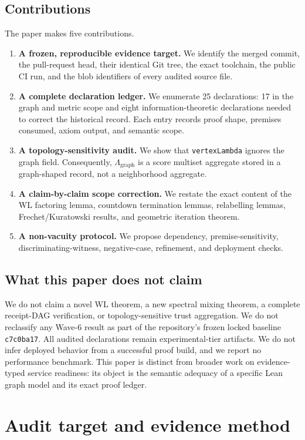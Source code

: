 \documentclass[10pt,letterpaper]{article}
\theoremstyle{definition}
\newcommand{\Lgraph}{\Lambda_{\mathrm{graph}}}
\newcommand{\baseline}{\texttt{c7c0ba17}}
\begin{document}
\subsection{Contributions}
The paper makes five contributions.
\begin{enumerate}
\item \textbf{A frozen, reproducible evidence target.} We identify the merged
  commit, the pull-request head, their identical Git tree, the exact toolchain,
  the public CI run, and the blob identifiers of every audited source file.
\item \textbf{A complete declaration ledger.} We enumerate 25 declarations:
  17 in the graph and metric scope and eight information-theoretic declarations
  needed to correct the historical record. Each entry records proof shape,
  premises consumed, axiom output, and semantic scope.
\item \textbf{A topology-sensitivity audit.} We show that
  \texttt{vertexLambda} ignores the graph field. Consequently,
  \(\Lgraph\) is a score multiset aggregate stored in a graph-shaped record,
  not a neighborhood aggregate.
\item \textbf{A claim-by-claim scope correction.} We restate the exact content
  of the WL factoring lemma, countdown termination lemmas, relabelling lemmas,
  Frechet/Kuratowski results, and geometric iteration theorem.
\item \textbf{A non-vacuity protocol.} We propose dependency,
  premise-sensitivity, discriminating-witness, negative-case, refinement, and
  deployment checks.
\end{enumerate}

\subsection{What this paper does not claim}
We do not claim a novel WL theorem, a new spectral mixing theorem, a complete
receipt-DAG verification, or topology-sensitive trust aggregation. We do not
reclassify any Wave-6 result as part of the repository's frozen locked baseline
\baseline. All audited declarations remain experimental-tier artifacts. We do
not infer deployed behavior from a successful proof build, and we report no
performance benchmark. This paper is distinct from broader work on
evidence-typed service readiness: its object is the semantic adequacy of a
specific Lean graph model and its exact proof ledger.

\section{Audit target and evidence method}\label{sec:method}
\end{document}
